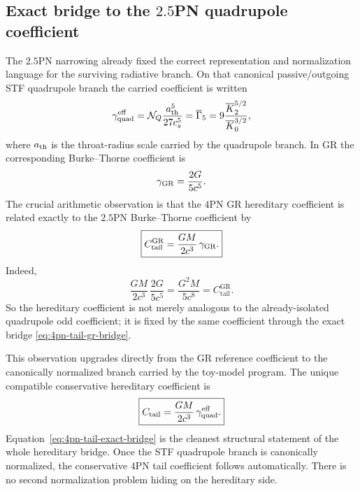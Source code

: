 \documentclass[11pt]{article}
\begin{document}
\subsection{Exact bridge to the \texorpdfstring{$2.5$}{2.5}PN quadrupole coefficient}
\label{sec:tail-exact-bridge}

The $2.5$PN narrowing already fixed the correct representation and normalization
language for the surviving radiative branch.  On that canonical passive/outgoing
STF quadrupole branch the carried coefficient is written
\begin{equation}
\gamma_{\rm quad}^{\rm eff}
=
\mathcal N_Q\frac{a_{\rm th}^5}{27c_s^5}
=
\overline\Gamma_5
=
9\frac{\overline K_2^{5/2}}{\overline K_0^{3/2}},
\label{eq:4pn-tail-carried-quadrupole-coefficient}
\end{equation}
where $a_{\rm th}$ is the throat-radius scale carried by the quadrupole branch.
In GR the corresponding Burke--Thorne coefficient is
\begin{equation}
\gamma_{\rm GR}
=
\frac{2G}{5c^5}.
\label{eq:4pn-tail-burke-thorne-gr}
\end{equation}
The crucial arithmetic observation is that the $4$PN GR hereditary coefficient
is related exactly to the $2.5$PN Burke--Thorne coefficient by
\begin{equation}
\boxed{
C_{\mathrm{tail}}^{\mathrm{GR}}
=
\frac{GM}{2c^3}\,\gamma_{\rm GR}.
}
\label{eq:4pn-tail-gr-bridge}
\end{equation}
Indeed,
\[
\frac{GM}{2c^3}\,\frac{2G}{5c^5}
=
\frac{G^2 M}{5c^8}
=
C_{\mathrm{tail}}^{\mathrm{GR}}.
\]
So the hereditary coefficient is not merely analogous to the already-isolated
quadrupole odd coefficient; it is fixed by the same coefficient through the
exact bridge \eqref{eq:4pn-tail-gr-bridge}.

This observation upgrades directly from the GR reference coefficient to the
canonically normalized branch carried by the toy-model program.  The unique
compatible conservative hereditary coefficient is
\begin{equation}
\boxed{
C_{\mathrm{tail}}
=
\frac{GM}{2c^3}\,\gamma_{\rm quad}^{\rm eff}.
}
\label{eq:4pn-tail-exact-bridge}
\end{equation}
Equation~\eqref{eq:4pn-tail-exact-bridge} is the cleanest structural statement
of the whole hereditary bridge.  Once the STF quadrupole branch is canonically
normalized, the conservative $4$PN tail coefficient follows automatically.
There is no second normalization problem hiding on the hereditary side.
\end{document}
